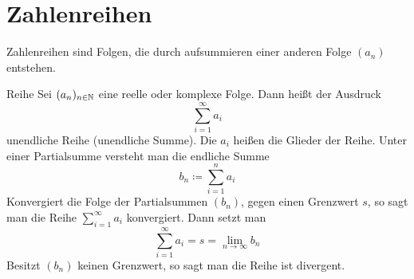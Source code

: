 \chapter{Zahlenreihen}
Zahlenreihen sind Folgen, die durch aufsummieren einer anderen Folge $(a_n)$ entstehen.

\begin{definition}{Reihe}
	Sei $(a_n)_{n\in\mathbb{N}}$ eine reelle oder komplexe Folge. Dann heißt der Ausdruck
	\begin{equation*}
		\sum\limits_{i=1}^\infty a_i
	\end{equation*}
	unendliche Reihe (unendliche Summe). Die $a_i$ heißen die Glieder der Reihe. Unter einer Partialsumme versteht man die endliche Summe
	\begin{equation*}
		b_n\coloneqq\sum\limits_{i=1}^n a_i
	\end{equation*}
	Konvergiert die Folge der Partialsummen $(b_n)$, gegen einen Grenzwert $s$, so sagt man die Reihe $\textstyle\sum_{i=1}^\infty a_i$ konvergiert. Dann setzt man
	\begin{equation*}
		\sum\limits_{i=1}^\infty a_i = s = \lim\limits_{n\to\infty}b_n
	\end{equation*}
	Besitzt $(b_n)$ keinen Grenzwert, so sagt man die Reihe ist divergent.
\end{definition}
